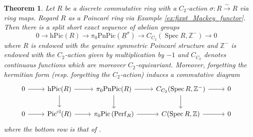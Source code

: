 \documentclass{article}
\DeclareMathOperator{\Spec}{Spec}
\newcommand{\ZZ}{\mathbb{Z}}
\newcommand{\pnpic}{\ensuremath{\mathrm{PnPic}}}
\newcommand{\perf}{\mathrm{Perf}}
\newtheorem{theorem}[equation]{Theorem}
\theoremstyle{definition}
\begin{document}
\begin{theorem}\label{theorem:Poincare_Pic_of_fixpt_Mackey_functor}
    Let $ R $ be a discrete commutative ring with a $ C_2 $-action $ \sigma \colon R \xrightarrow{\sim} R $ via ring maps. 
    Regard $ R $ as a Poincaré ring via Example \ref{ex:fixpt_Mackey_functor}. 
    Then there is a split short exact sequence of abelian groups
    \begin{equation*}
        0 \to \mathrm{hPic}(R) \to \pi_0\pnpic(\underline{R}^\sigma) \to C_{C_2}(\Spec R, \ZZ^{-}) \to 0
    \end{equation*}
    where $ R $ is endowed with the genuine symmetric Poincaré structure and $ \ZZ^{-} $ is endowed with the $ C_2 $-action given by multiplication by $ -1 $ and $ C_{C_2} $ denotes continuous functions which are moreover $ C_2 $-equivariant. 
    Moreover, forgetting the hermitian form (resp. forgetting the $ C_2 $-action) induces a commutative diagram
    \begin{equation*}
    \begin{tikzcd}
        0 \ar[r] & \mathrm{hPic}(R) \ar[r]\ar[d] & \pi_0\pnpic(R) \ar[r] \ar[d] & C_{C_2}(\Spec R, \ZZ^{-}) \ar[r] \ar[d] & 0 \\
        0 \ar[r] & \mathrm{Pic}^{\mathrm{cl}}(R) \ar[r] & \pi_0 \mathrm{Pic}\left(\perf_R\right) \ar[r] & C(\Spec R, \ZZ) \ar[r] & 0 
    \end{tikzcd}    
    \end{equation*}
    where the bottom row is that of \cite[Theorem 3.5]{MR1966659}. 
\end{theorem}
\end{document}
